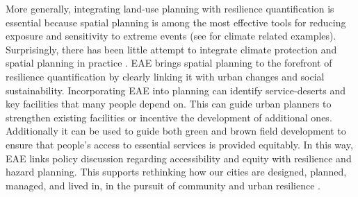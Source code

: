 \documentclass[onecolumn,doublespacing]{risa}
\let \citeA \textcite
\let \cite \parencite
\begin{document}
More generally, integrating land-use planning with resilience quantification is essential because spatial planning is among the most effective tools for reducing exposure and sensitivity to extreme events \cite{Brunetta2019-ki, Campbell2006-in, Hurlimann2012-uj} (see \citeA{Anderson2018-hr} for climate related examples). 
Surprisingly, there has been little attempt to integrate climate protection and spatial planning in practice \cite{Barnes2017-xf}.
EAE brings spatial planning to the forefront of resilience quantification by clearly linking it with urban changes and social sustainability.
Incorporating EAE into planning can identify service-deserts and key facilities that many people depend on.
This can guide urban planners to strengthen existing facilities or incentive the development of additional ones.
Additionally it can be used to guide both green and brown field development to ensure that people's access to essential services is provided equitably.
In this way, EAE links policy discussion regarding accessibility and equity with resilience and hazard planning.
This supports rethinking how our cities are designed, planned, managed, and lived in, in the pursuit of community and urban resilience \cite{Caldarice2019-tv}. 
\end{document}
